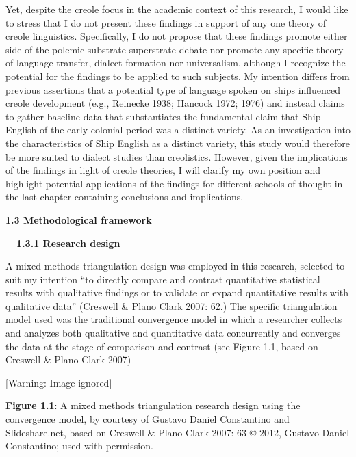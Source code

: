 \begin{styleNormali}
Yet, despite the creole focus in the academic context of this research, I would like to stress that I do not present these findings in support of any one theory of creole linguistics. Specifically, I do not propose that these findings promote either side of the polemic substrate-superstrate debate nor promote any specific theory of language transfer, dialect formation nor universalism, although I recognize the potential for the findings to be applied to such subjects. My intention differs from previous assertions that a potential type of language spoken on ships influenced creole development (e.g., Reinecke 1938; Hancock 1972; 1976) and instead claims to gather baseline data that substantiates the fundamental claim that Ship English of the early colonial period was a distinct variety. As an investigation into the characteristics of Ship English as a distinct variety, this study would therefore be more suited to dialect studies than creolistics. However, given the implications of the findings in light of creole theories, I will clarify my own position and highlight potential applications of the findings for different schools of thought in the last chapter containing conclusions and implications. 
\end{styleNormali}

\begin{styleNormali}
\textbf{1.3 Methodological framework}
\end{styleNormali}

\begin{styleNormali}
\textbf{\ \ 1.3.1 Research design}
\end{styleNormali}

\begin{styleNormali}
A mixed methods triangulation design was employed in this research, selected to suit my intention “to directly compare and contrast quantitative statistical results with qualitative findings or to validate or expand quantitative results with qualitative data” (Creswell \& Plano Clark 2007: 62.) The specific triangulation model used was the traditional convergence model in which a researcher collects and analyzes both qualitative and quantitative data concurrently and converges the data at the stage of comparison and contrast (see Figure 1.1, based on Creswell \& Plano Clark 2007)
\end{styleNormali}

\begin{center}
 [Warning: Image ignored] %

\end{center}
\begin{styleNormali}
\textbf{Figure 1.1}: A mixed methods triangulation research design using the convergence model, by courtesy of Gustavo Daniel Constantino and Slideshare.net, based on Creswell \& Plano Clark 2007: 63 © 2012, Gustavo Daniel Constantino; used with permission. 
\end{styleNormali}

